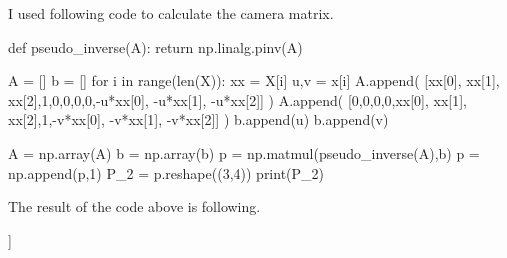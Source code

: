 \documentclass[10pt]{article}
\begin{document}
% 
I used following code to calculate the camera matrix.
\begin{python}
def pseudo_inverse(A):
    return np.linalg.pinv(A)

A = []
b = []
for i in range(len(X)):
    xx = X[i]
    u,v = x[i]
    A.append(
        [xx[0], xx[1], xx[2],1,0,0,0,0,-u*xx[0], -u*xx[1], -u*xx[2]]
    )
    A.append(
        [0,0,0,0,xx[0], xx[1], xx[2],1,-v*xx[0], -v*xx[1], -v*xx[2]]
    )
    b.append(u)
    b.append(v)

A = np.array(A)
b = np.array(b)
p = np.matmul(pseudo_inverse(A),b)
p = np.append(p,1)
P_2 = p.reshape((3,4))
print(P_2)
\end{python}
The result of the code above is following.
\begin{python}
[[-2.33259098e+00 -1.09993113e-01  3.37413916e-01  7.36673920e+02]
 [-2.31050254e-01 -4.79506029e-01  2.08717636e+00  1.53627756e+02]
 [-1.26379606e-03 -2.06770917e-03  5.14635233e-04  1.00000000e+00]]
\end{python}
\end{document}
